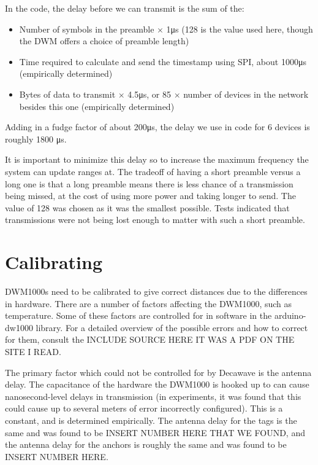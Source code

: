In the code, the delay before we can transmit is the sum of the:
\begin{itemize}
	\item Number of symbols in the preamble $\times$ 1\si{\micro\second} (128 is the value used here, though the DWM offers a choice of preamble length)
	\item Time required to calculate and send the timestamp using SPI, about 1000\si{\micro\second} (empirically determined)
	\item Bytes of data to transmit $\times$ 4.5\si{\micro\second}, or 85 $\times$ number of devices in the network besides this one (empirically determined)
\end{itemize}

Adding in a fudge factor of about 200\si{\micro\second}, the delay we use in code for 6 devices is roughly 1800 \si{\micro\second}.

It is important to minimize this delay so to increase the maximum frequency the system can update ranges at. The tradeoff of having a short preamble versus a long one is that a long preamble means there is less chance of a transmission being missed, at the cost of using more power and taking longer to send. The value of 128 was chosen as it was the smallest possible. Tests indicated that transmissions were not being lost enough to matter with such a short preamble.

\section{Calibrating}
DWM1000s need to be calibrated to give correct distances due to the differences in hardware. There are a number of factors affecting the DWM1000, such as temperature. Some of these factors are controlled for in software in the arduino-dw1000 library. For a detailed overview of the possible errors and how to correct for them, consult the INCLUDE SOURCE HERE IT WAS A PDF ON THE SITE I READ.

The primary factor which could not be controlled for by Decawave is the antenna delay. The capacitance of the hardware the DWM1000 is hooked up to can cause nanosecond-level delays in transmission (in experiments, it was found that this could cause up to several meters of error incorrectly configured). This is a constant, and is determined empirically. The antenna delay for the tags is the same and was found to be INSERT NUMBER HERE THAT WE FOUND, and the antenna delay for the anchors is roughly the same and was found to be INSERT NUMBER HERE.

